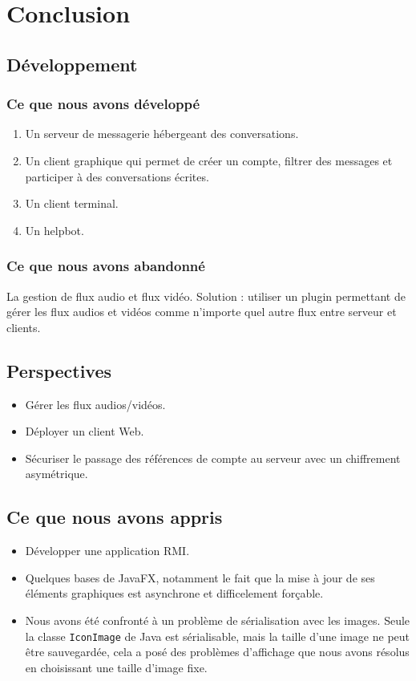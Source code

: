 \documentclass[11pt,dvipsnames,svgnames]{report}
\begin{document}
\chapter{Conclusion}
\section{Développement}
\subsection{Ce que nous avons développé}
\begin{enumerate}
\item Un serveur de messagerie hébergeant des conversations.
\item Un client graphique qui permet de créer un compte, filtrer des messages et participer à des conversations écrites.
\item Un client terminal.
\item Un helpbot.
\end{enumerate}
\subsection{Ce que nous avons abandonné}
La gestion de flux audio et flux vidéo.
Solution : utiliser un plugin permettant de gérer les flux audios et vidéos comme n'importe quel autre flux entre serveur et clients.
\section{Perspectives}
\begin{itemize}
\item Gérer les flux audios/vidéos.
\item Déployer un client Web.
\item Sécuriser le passage des références de compte au serveur avec un chiffrement asymétrique.
\end{itemize}

\section{Ce que nous avons appris}
\begin{itemize}
	\item Développer une application RMI.
	\item Quelques bases de JavaFX, notamment le fait que la mise à jour de ses éléments graphiques est asynchrone et difficelement forçable.
	\item Nous avons été confronté à un problème de sérialisation avec les images. Seule la classe \texttt{IconImage} de Java est sérialisable, mais la taille d'une image ne peut être sauvegardée, cela a posé des problèmes d'affichage que nous avons résolus en choisissant une taille d'image fixe.
\end{itemize}
\end{document}
